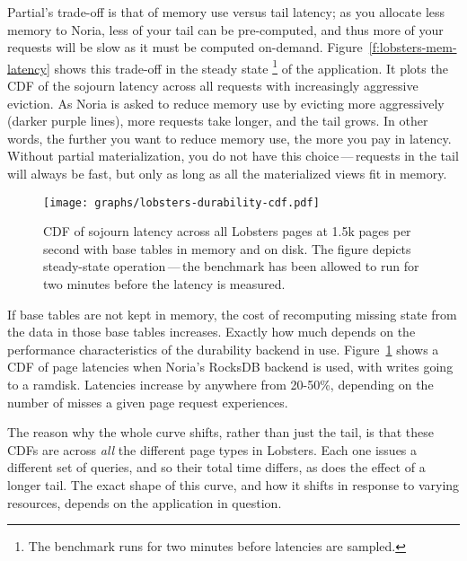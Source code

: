 Partial's trade-off is that of memory use versus tail latency; as you allocate
less memory to Noria, less of your tail can be pre-computed, and thus more of
your requests will be slow as it must be computed on-demand.
Figure~\ref{f:lobsters-mem-latency} shows this trade-off in the steady state%
\footnote{The benchmark runs for two minutes before latencies are sampled.}
of the application. It plots the CDF of the sojourn latency across all requests
with increasingly aggressive eviction. As Noria is asked to
reduce memory use by evicting more aggressively (darker purple lines), more
requests take longer, and the tail grows. In other words, the further you want
to reduce memory use, the more you pay in latency. Without partial
materialization, you do not have this choice\,---\,requests in the tail will
always be fast, but only as long as all the materialized views fit in memory.

\begin{figure}[h]
  \centering
  \texttt{[image: graphs/lobsters-durability-cdf.pdf]}
  \caption{CDF of sojourn latency across all Lobsters pages at 1.5k pages per
  second with base tables in memory and on disk. The figure depicts steady-state
  operation\,---\,the benchmark has been allowed to run for two minutes before
  the latency is measured.}
  \label{f:lobsters-dur-latency}
\end{figure}

If base tables are not kept in memory, the cost of recomputing missing state
from the data in those base tables increases. Exactly how much depends on the
performance characteristics of the durability backend in use.
Figure~\ref{f:lobsters-dur-latency} shows a CDF of page latencies when Noria's
RocksDB backend is used, with writes going to a ramdisk. Latencies increase by
anywhere from 20-50\%, depending on the number of misses a given page request
experiences.

The reason why the whole curve shifts, rather than just the tail, is that these
CDFs are across \emph{all} the different page types in Lobsters. Each one issues
a different set of queries, and so their total time differs, as does the effect
of a longer tail. The exact shape of this curve, and how it shifts in response
to varying resources, depends on the application in question.


